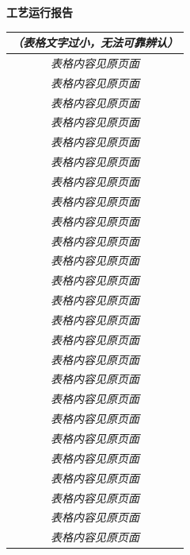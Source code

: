 \documentclass[UTF8,10pt,a4paper,fontset=fandol]{ctexart}
\begin{document}
\vspace{1.5em}

\noindent
\begin{minipage}[t]{0.47\textwidth}
\centering
\textbf{工艺运行报告}

\vspace{0.3em}
\small
\begin{tabularx}{\linewidth}{|c|X|}
\hline
\multicolumn{2}{c}{\textit{（表格文字过小，无法可靠辨认）}}\\
\hline
\multicolumn{2}{c}{\textit{表格内容见原页面}}\\
\hline
\multicolumn{2}{c}{\textit{表格内容见原页面}}\\
\hline
\multicolumn{2}{c}{\textit{表格内容见原页面}}\\
\hline
\multicolumn{2}{c}{\textit{表格内容见原页面}}\\
\hline
\multicolumn{2}{c}{\textit{表格内容见原页面}}\\
\hline
\multicolumn{2}{c}{\textit{表格内容见原页面}}\\
\hline
\multicolumn{2}{c}{\textit{表格内容见原页面}}\\
\hline
\multicolumn{2}{c}{\textit{表格内容见原页面}}\\
\hline
\multicolumn{2}{c}{\textit{表格内容见原页面}}\\
\hline
\multicolumn{2}{c}{\textit{表格内容见原页面}}\\
\hline
\multicolumn{2}{c}{\textit{表格内容见原页面}}\\
\hline
\multicolumn{2}{c}{\textit{表格内容见原页面}}\\
\hline
\multicolumn{2}{c}{\textit{表格内容见原页面}}\\
\hline
\multicolumn{2}{c}{\textit{表格内容见原页面}}\\
\hline
\multicolumn{2}{c}{\textit{表格内容见原页面}}\\
\hline
\multicolumn{2}{c}{\textit{表格内容见原页面}}\\
\hline
\multicolumn{2}{c}{\textit{表格内容见原页面}}\\
\hline
\multicolumn{2}{c}{\textit{表格内容见原页面}}\\
\hline
\multicolumn{2}{c}{\textit{表格内容见原页面}}\\
\hline
\multicolumn{2}{c}{\textit{表格内容见原页面}}\\
\hline
\multicolumn{2}{c}{\textit{表格内容见原页面}}\\
\hline
\multicolumn{2}{c}{\textit{表格内容见原页面}}\\
\hline
\multicolumn{2}{c}{\textit{表格内容见原页面}}\\
\hline
\multicolumn{2}{c}{\textit{表格内容见原页面}}\\
\hline
\multicolumn{2}{c}{\textit{表格内容见原页面}}\\
\hline
\end{tabularx}
\end{minipage}
\end{document}
